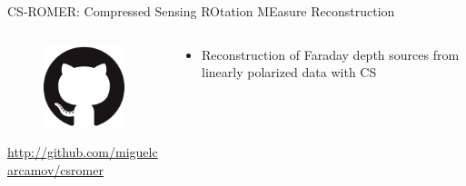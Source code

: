 \documentclass[xetex,aspectratio=169]{beamer}
\begin{document}
    \begin{frame}{CS-ROMER: Compressed Sensing ROtation MEasure Reconstruction}
        \begin{columns}[onlytextwidth,t]
        \begin{column}{.5\textwidth}
            \begin{figure}
                \centering
                \includegraphics[scale=0.5]{figures/logos/GitHub-Mark-120px-plus.png}
            \end{figure}
            
            \url{http://github.com/miguelcarcamov/csromer}
        \end{column}
    \begin{column}{.5\textwidth}
        \begin{itemize}
            \item Reconstruction of Faraday depth sources from linearly polarized data with CS

        \end{itemize}
    \end{column}%
    
    \end{columns}
    \end{frame}
    
\end{document}
